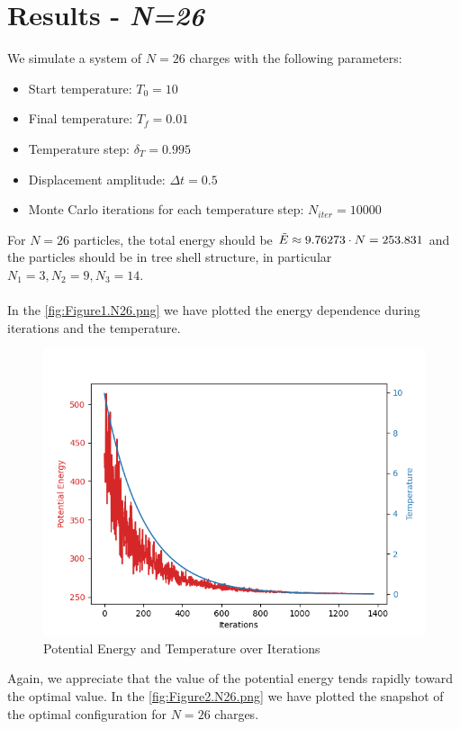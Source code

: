 \documentclass{article}
\begin{document}
\section{Results - \textit{N=26}}
We simulate a system of $N=26$ charges with the following parameters:
\begin{itemize}
    \item Start temperature: $T_0=10$
    \item Final temperature: $T_f=0.01$
    \item Temperature step: $\delta_T=0.995$
    \item Displacement amplitude: $\Delta t=0.5$
    \item Monte Carlo iterations for each temperature step: $N_{iter}=10000$
\end{itemize}
For $N=26$ particles, the total energy should be $ \Tilde{E}\approx9.76273\cdot N=253.831
$ and the particles should be in tree shell structure, in particular $N_1=3,N_2=9,N_3=14$.\\\\
In the \autoref{fig:Figure1.N26.png} we have plotted the energy dependence during iterations and the temperature.
\begin{figure}[H]
    \centering
    \includegraphics[width=\linewidth]{images/Figure1.N26.png}
    \caption{Potential Energy and Temperature over Iterations}
    \label{fig:Figure1.N26.png}
\end{figure}
\noindent Again, we appreciate that the value of the potential energy tends rapidly toward the optimal value.
\clearpage
\noindent In the \autoref{fig:Figure2.N26.png} we have plotted the snapshot of the optimal configuration for $N=26$ charges.
\end{document}
